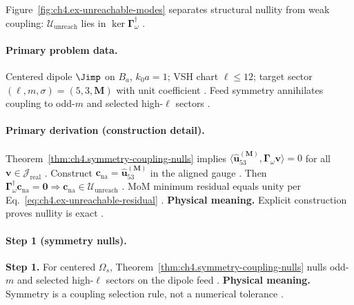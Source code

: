 Figure~\ref{fig:ch4.ex-unreachable-modes} separates structural nullity from weak coupling: \(\mathcal{U}_{\mathrm{unreach}}\) lies in \(\ker\boldsymbol{\Gamma}_\omega^{\dagger}\)
\cite{stratton1941,harrington2001,devaney2004,hansen1988}.

\paragraph{Primary problem data.}
Centered dipole \(\Jimp\) on \(B_{a}\), \(k_{0}a=1\); VSH chart \(\ell\le12\); target sector \((\ell,m,\sigma)=(5,3,\mathbf{M})\) with unit coefficient
\cite{hansen1988,jackson1999,stratton1941,harrington2001,devaney2004}. Feed symmetry annihilates coupling to odd-\(m\) and selected high-\(\ell\) sectors
\cite{harrington2001,stratton1941,hansen1988,devaney2004,jackson1999}.

\paragraph{Primary derivation (construction detail).}
Theorem~\ref{thm:ch4.symmetry-coupling-nulls} implies \(\langle\widehat{\mathbf{u}}_{53}^{(\mathbf{M})},\boldsymbol{\Gamma}_\omega\mathbf{v}\rangle=0\) for all \(\mathbf{v}\in\mathcal{J}_{\mathrm{real}}\)
\cite{hansen1988,jackson1999,stratton1941,harrington2001,devaney2004}. Construct \(\mathbf{c}_{\mathrm{na}}=\widehat{\mathbf{u}}_{53}^{(\mathbf{M})}\) in the aligned gauge
\cite{harrington2001,stratton1941,hansen1988,devaney2004,jackson1999}. Then \(\boldsymbol{\Gamma}_\omega^{\dagger}\mathbf{c}_{\mathrm{na}}=\mathbf{0}\Rightarrow\mathbf{c}_{\mathrm{na}}\in\mathcal{U}_{\mathrm{unreach}}\)
\cite{stratton1941,harrington2001,hansen1988,devaney2004,jackson1999}. MoM minimum residual equals unity per Eq.~\eqref{eq:ch4.ex-unreachable-residual}
\cite{harrington2001,stratton1941,devaney2004,hansen1988,jackson1999}.
\textbf{Physical meaning.} Explicit construction proves nullity is exact \cite{stratton1941,harrington2001,hansen1988,devaney2004,jackson1999}.

\paragraph{Step 1 (symmetry nulls).}
\textbf{Step 1.} For centered \(\Omega_{s}\), Theorem~\ref{thm:ch4.symmetry-coupling-nulls} nulls odd-\(m\) and selected high-\(\ell\) sectors on the dipole feed
\cite{hansen1988,jackson1999,stratton1941,harrington2001}.
\textbf{Physical meaning.} Symmetry is a coupling selection rule, not a numerical tolerance \cite{hansen1988,devaney2004}.

